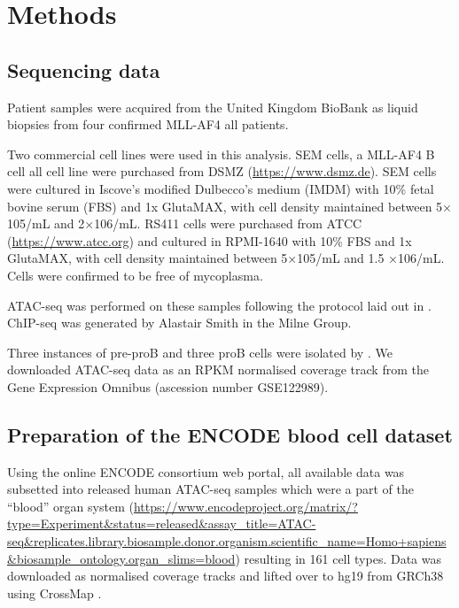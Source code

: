 \section{Methods} \label{ch5:methods}



\subsection{Sequencing data}

Patient samples were acquired from the United Kingdom BioBank as liquid biopsies from four confirmed MLL-AF4 \gls{all} patients. 

Two commercial cell lines were used in this analysis. SEM cells, a MLL-AF4 B cell \gls{all} cell line were purchased from DSMZ (\url{https://www.dsmz.de}). SEM cells were cultured in Iscove’s modified Dulbecco’s medium (IMDM) with 10\% fetal bovine serum (FBS) and 1x GlutaMAX, with cell density maintained between 5× 105/mL and 2×106/mL. RS411 cells were purchased from ATCC (\url{https://www.atcc.org}) and cultured in RPMI-1640 with 10\% FBS and 1x GlutaMAX, with cell density maintained between 5×105/mL and 1.5 ×106/mL. Cells were confirmed to be free of mycoplasma.

ATAC-seq was performed on these samples following the protocol laid out in \textcite{Buenrostro2015}. ChIP-seq was generated by Alastair Smith in the Milne Group. 

Three instances of pre-proB and three proB cells were isolated by \textcite{OByrne2019}. We downloaded ATAC-seq data as an RPKM normalised coverage track from the Gene Expression Omnibus (ascession number GSE122989). 

\subsection{Preparation of the ENCODE blood cell dataset}

Using the online ENCODE consortium web portal, all available data was subsetted into released human ATAC-seq samples which were a part of the ``blood'' organ system (\url{https://www.encodeproject.org/matrix/?type=Experiment&status=released&assay_title=ATAC-seq&replicates.library.biosample.donor.organism.scientific_name=Homo+sapiens&biosample_ontology.organ_slims=blood}) resulting in 161 cell types. Data was downloaded as normalised coverage tracks and lifted over to hg19 from GRCh38 using CrossMap \cite{H2014}.

